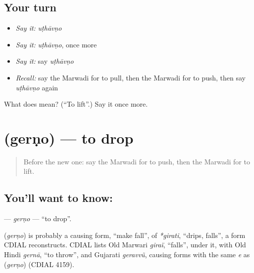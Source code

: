 \subsection*{Your turn}
\begin{itemize}
\raggedright
  \item \emph{Say it:} \emph{uṭhāvṇo}
  \item \emph{Say it:} \emph{uṭhāvṇo}, once more
  \item \emph{Say it:} say \emph{uṭhāvṇo}
  \item \emph{Recall:} say the Marwadi for to pull, then the Marwadi for to push, then say \emph{uṭhāvṇo} again
\end{itemize}

\begin{tcolorbox}[breakable,colback=teal!4,colframe=teal!35!black,title={Before you move on}]
What does  mean? (\textquotedblleft{}To lift\textquotedblright{}.) Say it once more.
\end{tcolorbox}
\section[\texorpdfstring{\mw{गेरणो} (gerṇo)}{गेरणो (gerṇo)}]{ (gerṇo) — to drop}

\label{lesson:MW-C106-gerno}



\begin{quote}
Before the new one: say the Marwadi for to push, then the Marwadi for to lift.
\end{quote}

\subsection*{You'll want to know: }
\textbf{} — \emph{gerṇo} — \textquotedblleft{}to drop\textquotedblright{}.

\begin{cousinweb}
\textbf{} (\emph{gerṇo}) is probably a causing form, \textquotedblleft{}make fall\textquotedblright{}, of \emph{*girati}, \textquotedblleft{}drips, falls\textquotedblright{}, a form CDIAL reconstructs. CDIAL lists Old Marwari \emph{giraï}, \textquotedblleft{}falls\textquotedblright{}, under it, with Old Hindi \emph{gernā}, \textquotedblleft{}to throw\textquotedblright{}, and Gujarati \emph{geravvũ}, causing forms with the same \emph{e} as \textbf{} (\emph{gerṇo}) (CDIAL 4159).
\end{cousinweb}

